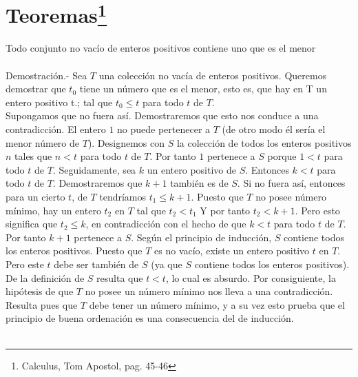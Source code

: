 \section[Teoremas]{Teoremas\footnote{Calculus, Tom Apostol, pag. 45-46}}

\begin{teo}
Todo conjunto no vacío de enteros positivos contiene uno que es el menor \\\\
Demostración.- \; Sea $T$ una colección no vacía de enteros positivos. Queremos demostrar que $t_0$ tiene un número que es el menor, esto es, que hay en T un entero positivo t.; tal que $t_0\leq t$ para todo $t$ de $T$.\\
Supongamos que no fuera así. Demostraremos que esto nos conduce a una contradicción. El entero $1$ no puede pertenecer a $T$ (de otro modo él sería el menor número de $T$). Designemos con $S$ la colección de todos los enteros positivos $n$ tales que $n<t$ para todo $t$ de $T$. Por tanto $1$ pertenece a $S$ porque $1 < t$ para todo $t$ de $T$. Seguidamente, sea $k$ un entero positivo de $S$. Entonces $k < t$ para todo $t$ de $T$. Demostraremos que $k + 1$ también es de $S$. Si no fuera así, entonces para un cierto $t$, de $T$ tendríamos $t_1 \leq k+1$. Puesto que $T$ no posee número mínimo, hay un entero $t_2$ en $T$ tal que $t_2 < t_1$ Y por tanto $t_2 < k + 1$. Pero esto significa que $t_2 \leq k$, en contradicción con el hecho de que $k < t$ para todo $t$ de $T$. Por tanto $k + 1$ pertenece a $S$. Según el principio de inducción, $S$ contiene todos los enteros positivos. Puesto que $T$ es no vacío, existe un entero positivo $t$ en $T$. Pero este $t$ debe ser también de $S$ (ya que $S$ contiene todos los enteros positivos). De la definición de $S$ resulta que $t < t$, lo cual es absurdo. Por consiguiente, la hipótesis de que $T$ no posee un número mínimo nos lleva a una contradicción. Resulta pues que $T$ debe tener un número mínimo, y a su vez esto prueba que el principio de buena ordenación es una consecuencia del de inducción.\\\\
\end{teo}

